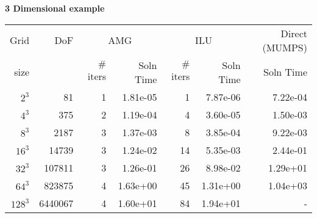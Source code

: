 \documentclass{beamer}
\begin{document}
\begin{frame}

\textbf{3 Dimensional example}

\vspace{.1in}

{\footnotesize
\begin{tabular}{rrrrrrr}
\hline

 Grid  &      DoF & \multicolumn{2}{c}{AMG} & \multicolumn{2}{c}{ILU}& Direct (MUMPS)  \\

  size &       &  $\#$ iters &  Soln Time &  $\#$ iters &  Soln Time &     Soln Time \\

\hline


  $  2  ^3$ &      81 &        1 &   1.81e-05 &             1 &   7.87e-06 &   7.22e-04 \\
  $  4  ^3$ &     375 &        2 &   1.19e-04 &            4 &   3.60e-05 &   1.50e-03 \\
  $  8  ^3$ &    2187 &        3 &   1.37e-03 &             8 &   3.85e-04 &    9.22e-03 \\
  $ 16 ^3$  &   14739 &        3 &   1.24e-02 &        14 &   5.35e-03 &    2.44e-01 \\
  $ 32 ^3$  &  107811 &        3 &   1.26e-01 &         26 &   8.98e-02 &   1.29e+01 \\
  $ 64 ^3$  &   823875 &        4 &   1.63e+00 &     45 &   1.31e+00&          1.04e+03 \\
  $128^3$    &  6440067 &        4 &   1.60e+01 &  84 &   1.94e+01 &        - \\


\hline
\end{tabular}

}

\end{frame}
\end{document}
